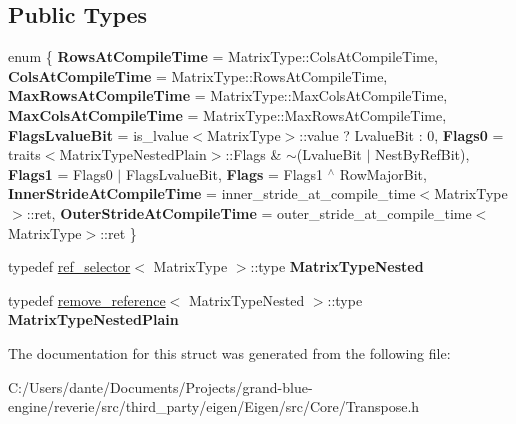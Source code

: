 \subsection*{Public Types}
\begin{DoxyCompactItemize}
\item 
\mbox{\label{struct_eigen_1_1internal_1_1traits_3_01_transpose_3_01_matrix_type_01_4_01_4_a729bca020e0c7f4dd26a240cceb3657b}} 
enum \{ \newline
{\bfseries Rows\+At\+Compile\+Time} = Matrix\+Type\+::Cols\+At\+Compile\+Time, 
{\bfseries Cols\+At\+Compile\+Time} = Matrix\+Type\+::Rows\+At\+Compile\+Time, 
{\bfseries Max\+Rows\+At\+Compile\+Time} = Matrix\+Type\+::Max\+Cols\+At\+Compile\+Time, 
{\bfseries Max\+Cols\+At\+Compile\+Time} = Matrix\+Type\+::Max\+Rows\+At\+Compile\+Time, 
\newline
{\bfseries Flags\+Lvalue\+Bit} = is\+\_\+lvalue$<$Matrix\+Type$>$\+::value ? Lvalue\+Bit \+: 0, 
{\bfseries Flags0} = traits$<$Matrix\+Type\+Nested\+Plain$>$\+::Flags \& $\sim$(Lvalue\+Bit $\vert$ Nest\+By\+Ref\+Bit), 
{\bfseries Flags1} = Flags0 $\vert$ Flags\+Lvalue\+Bit, 
{\bfseries Flags} = Flags1 $^\wedge$ Row\+Major\+Bit, 
\newline
{\bfseries Inner\+Stride\+At\+Compile\+Time} = inner\+\_\+stride\+\_\+at\+\_\+compile\+\_\+time$<$Matrix\+Type$>$\+::ret, 
{\bfseries Outer\+Stride\+At\+Compile\+Time} = outer\+\_\+stride\+\_\+at\+\_\+compile\+\_\+time$<$Matrix\+Type$>$\+::ret
 \}
\item 
\mbox{\label{struct_eigen_1_1internal_1_1traits_3_01_transpose_3_01_matrix_type_01_4_01_4_af03354ff50cf117fe23a0caac756e3ee}} 
typedef \mbox{\hyperlink{struct_eigen_1_1internal_1_1ref__selector}{ref\+\_\+selector}}$<$ Matrix\+Type $>$\+::type {\bfseries Matrix\+Type\+Nested}
\item 
\mbox{\label{struct_eigen_1_1internal_1_1traits_3_01_transpose_3_01_matrix_type_01_4_01_4_ae5b6205259511832d2015de8dcf8e40b}} 
typedef \mbox{\hyperlink{struct_eigen_1_1internal_1_1remove__reference}{remove\+\_\+reference}}$<$ Matrix\+Type\+Nested $>$\+::type {\bfseries Matrix\+Type\+Nested\+Plain}
\end{DoxyCompactItemize}


The documentation for this struct was generated from the following file\+:\begin{DoxyCompactItemize}
\item 
C\+:/\+Users/dante/\+Documents/\+Projects/grand-\/blue-\/engine/reverie/src/third\+\_\+party/eigen/\+Eigen/src/\+Core/Transpose.\+h\end{DoxyCompactItemize}
